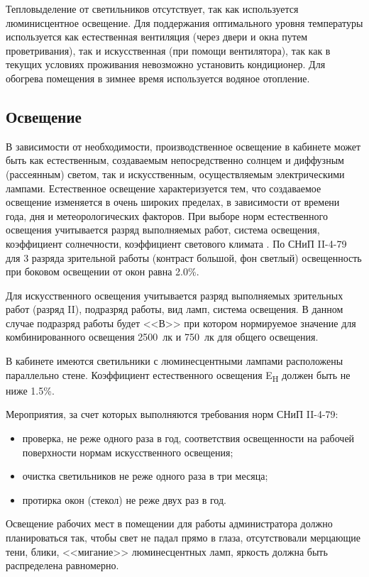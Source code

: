 Тепловыделение от светильников отсутствует, так как используется люминисцентное освещение.
Для поддержания оптимального уровня температуры используется как естественная вентиляция (через двери и окна путем проветривания), так и искусственная (при помощи вентилятора), так как в текущих условиях проживания невозможно установить кондиционер.
Для обогрева помещения в зимнее время используется водяное отопление.

\subsection{Освещение}

В зависимости от необходимости, производственное освещение в кабинете может быть как естественным, создаваемым непосредственно солнцем и диффузным (рассеянным) светом, так и искусственным, осуществляемым электрическими лампами.
Естественное освещение характеризуется тем, что создаваемое освещение изменяется в очень широких пределах, в зависимости от времени года, дня и метеорологических факторов.
При выборе норм естественного освещения учитывается разряд выполняемых работ, система освещения, коэффициент солнечности, коэффициент светового климата \cite{oot}.
По СНиП II-4-79 для 3 разряда зрительной работы (контраст большой, фон светлый) освещенность при боковом освещении от окон равна 2.0\%.

Для искусственного освещения учитывается разряд выполняемых зрительных работ (разряд II), подразряд работы, вид ламп, система освещения.
В данном случае подразряд работы будет <<В>> при котором нормируемое значение для комбинированного освещения 2500~лк и 750~лк для общего освещения.

В кабинете имеются светильники с люминесцентными лампами расположены параллельно стене.
Коэффициент естественного освещения E\textsubscript{H} должен быть не ниже 1.5\%.

Мероприятия, за счет которых выполняются требования норм СНиП II-4-79:
\begin{itemize}
  \item проверка, не реже одного раза в год, соответствия освещенности на рабочей поверхности нормам искусственного освещения;
  \item очистка светильников не реже одного раза в три месяца;
  \item протирка окон (стекол) не реже двух раз в год.
\end{itemize}

Освещение рабочих мест в помещении для работы администратора должно планироваться так, чтобы свет не падал прямо в глаза, отсутствовали мерцающие тени, блики, <<мигание>> люминесцентных ламп, яркость должна быть распределена равномерно.

